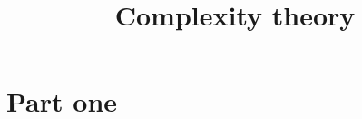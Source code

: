 



\title{Complexity theory}


\maketitle

\label{section-phantom}

\tableofcontents


\part{Part one}








